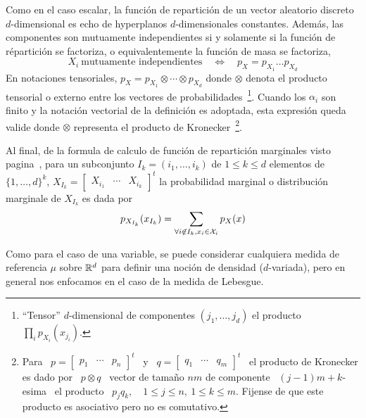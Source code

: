 Como en  el caso escalar, la  funci\'on de repartici\'on de  un vector aleatorio
discreto $d$-dimensional es echo de hyperplanos $d$-dimensionales constantes.
Adem\'as, las  componentes son mutuamente  independientes si y solamente  si la
funci\'on de  r\'epartici\'on se factoriza,  o equivalentemente la  funci\'on de
masa se factoriza, \ie
%
\[
X_i  \:  \mbox{mutuamente independientes}  \quad  \Leftrightarrow  \quad p_X  =
p_{X_1} \ldots  p_{X_d}
\]
%
En notaciones tensoriales, $p_X =  p_{X_1} \otimes \cdots \otimes p_{X_d}$ donde
$\otimes$  denota  el  producto  tensorial  o  externo  entre  los  vectores  de
probabilidades~\footnote{``Tensor''      $d$-dimensional      de     componentes
  $(j_1,\ldots,j_d)$  el  producto $\prod_i  p_{X_i}  (x_{j_i})$.}.  Cuando  los
$\alpha_i$ son finito y la  notaci\'on vectorial de la definici\'on es adoptada,
esta  expresi\'on  queda  valide  donde  $\otimes$  representa  el  producto  de
Kronecker~\footnote{Para   \    $p   =   \begin{bmatrix}   p_1    &   \cdots   &
    p_n  \end{bmatrix}^t$   \  y  \  $q   =  \begin{bmatrix}  q_1   &  \cdots  &
    q_m \end{bmatrix}^t$ \ el producto de  Kronecker es dado por \ $p \otimes q$
  \ vector de tama\~no $n m$ de componente \ $(j-1) m + k$-esima \ el producto \
  $p_j  q_k, \quad 1  \le j  \le n,  \: 1  \le k  \le m$.   Fijense de  que este
  producto es asociativo pero no es comutativo.\label{foot:MP:Kronecker}}.

Al  final, de la  formula de  calculo de  funci\'on de  repartici\'on marginales
visto  pagina~\pageref{pagina:MP:MarginalesF},   para  un  subconjunto   $I_k  =
(i_1,\ldots,i_k)$ de  $1 \le k  \le d$ elementos  de $\{ 1  , \ldots ,  d \}^k$,
$X_{I_k}  =  \begin{bmatrix}  X_{i_1}  &  \cdots  &  X_{i_k}\end{bmatrix}^t$  la
probabilidad marginal o distribuci\'on marginale de $X_{I_k}$ es dada por
%
\[
p_{X_{I_k}}(x_{I_k}) = \sum_{\forall i \not\in I_k, x_i \in \mathcal{X}_i} p_X(x)
\]




\label{sec:MP:VecContinuo}

Como para  el caso  de una  variable, se puede  considerar cualquiera  medida de
referencia  $\mu$  sobre  $\mathbb{R}^d$   para  definir  una  noci\'on  de  densidad
($d$-variada),  pero  en general  nos  enfocamos  en el  caso  de  la medida  de
Lebesgue.

